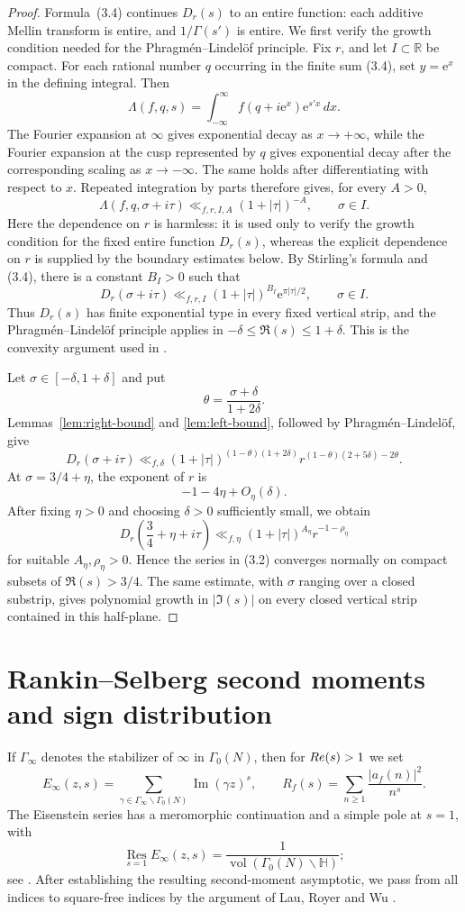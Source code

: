 \documentclass[10pt,a4paper]{amsart}
\newcommand{\e}{\mathrm{e}}
\newcommand{\R}{\mathbb R}
\newcommand{\Hh}{\mathbb H}
\newcommand{\Res}{\operatorname*{Res}}
\newcommand{\vol}{\operatorname{vol}}
\begin{document}
\begin{proof}
Formula~(3.4) continues $D_r(s)$ to an entire function: each additive
Mellin transform is entire, and $1/\Gamma(s')$ is entire. We first verify
the growth condition needed for the Phragm\'en--Lindel\"of principle.
Fix $r$, and let $I\subset\R$ be compact. For each rational number $q$
occurring in the finite sum (3.4), set $y=\e^x$ in the defining integral.
Then
\[
\Lambda(f,q,s)
 =\int_{-\infty}^{\infty}
 f(q+i\e^x)\e^{s'x}\,dx.
\]
The Fourier expansion at $\infty$ gives exponential decay as
$x\to+\infty$, while the Fourier expansion at the cusp represented by
$q$ gives exponential decay after the corresponding scaling as
$x\to-\infty$. The same holds after differentiating with respect to $x$.
Repeated integration by parts therefore gives, for every $A>0$,
\[
\Lambda(f,q,\sigma+i\tau)
 \ll_{f,r,I,A}(1+|\tau|)^{-A},
 \qquad \sigma\in I.
\]
Here the dependence on $r$ is harmless: it is used only to verify the
growth condition for the fixed entire function $D_r(s)$, whereas the
explicit dependence on $r$ is supplied by the boundary estimates below.
By Stirling's formula and (3.4), there is a constant $B_I>0$ such that
\[
D_r(\sigma+i\tau)
 \ll_{f,r,I}(1+|\tau|)^{B_I}\e^{\pi|\tau|/2},
 \qquad \sigma\in I.
\]
Thus $D_r(s)$ has finite exponential type in every fixed vertical strip,
and the Phragm\'en--Lindel\"of principle applies in
$-\delta\le\Re(s)\le1+\delta$. This is the convexity argument used in
\cite[Section~4]{HKKL}.

Let $\sigma\in[-\delta,1+\delta]$ and put
\[
\theta=\frac{\sigma+\delta}{1+2\delta}.
\]
Lemmas~\ref{lem:right-bound} and \ref{lem:left-bound}, followed by
Phragm\'en--Lindel\"of, give
\[
D_r(\sigma+i\tau)
\ll_{f,\delta}
(1+|\tau|)^{(1-\theta)(1+2\delta)}
 r^{(1-\theta)(2+5\delta)-2\theta}.
\]
At $\sigma=3/4+\eta$, the exponent of $r$ is
\[
-1-4\eta+O_\eta(\delta).
\]
After fixing $\eta>0$ and choosing $\delta>0$ sufficiently small, we obtain
\[
D_r\left(\frac34+\eta+i\tau\right)
\ll_{f,\eta}(1+|\tau|)^{A_\eta}r^{-1-\rho_\eta}
\]
for suitable $A_\eta,\rho_\eta>0$. Hence the series in (3.2) converges
normally on compact subsets of $\Re(s)>3/4$. The same estimate, with
$\sigma$ ranging over a closed substrip, gives polynomial growth in
$|\Im(s)|$ on every closed vertical strip contained in this half-plane.
\end{proof}

\section{Rankin--Selberg second moments and sign distribution}\label{sec:second-moment}
If $\Gamma_\infty$ denotes the stabilizer of $\infty$ in $\Gamma_0(N)$, then
for ${\rm Re}(s)>1$ we set
\[
E_\infty(z,s)=
\sum_{\gamma\in\Gamma_\infty\backslash\Gamma_0(N)}
\operatorname{Im}(\gamma z)^s,
\qquad
R_f(s)=\sum_{n\ge1}\frac{|a_f(n)|^2}{n^s}.
\]
The Eisenstein series has a meromorphic continuation and a simple pole at
$s=1$, with
\[
\Res_{s=1}E_\infty(z,s)
=\frac{1}{\vol(\Gamma_0(N)\backslash\Hh)};
\]
see \cite[Chapter~6]{IwaniecSpectral}. After establishing the resulting
second-moment asymptotic, we pass from all indices to square-free indices
by the argument of Lau, Royer and Wu
\cite[Section~3]{LRW}.
\end{document}
